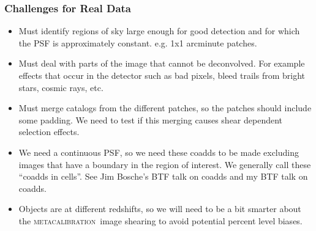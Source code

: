 \documentclass{beamer}
\newcommand{\mcal}{\textsc{metacalibration}}
\begin{document}
\frame
{
    \frametitle{Challenges for Real Data}

 
    \begin{itemize}


        \item Must identify regions of sky large enough for
            good detection and for which the PSF is approximately constant.
            e.g. 1x1 arcminute patches.

        \item Must deal with parts of the image that cannot be deconvolved. For
            example effects that occur in the detector such as bad pixels, bleed trails
            from bright stars, cosmic rays, etc.

        \item Must merge catalogs from the different patches, so
            the patches should include some padding.  We need to test if this
            merging causes shear dependent selection effects.

        \item We need a continuous PSF, so we need these coadds to be made
            excluding images that have a boundary in the region of interest.
            We generally call these ``coadds in cells''.
            See Jim Bosche's BTF talk on coadds and my BTF talk on coadds.

        \item Objects are at different redshifts, so we will need to be a bit
            smarter about the \mcal\ image shearing to avoid potential
            percent level biases.

    \end{itemize}

}



 


\end{document}
